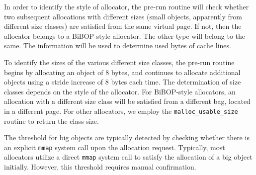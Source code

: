 In order to identify the style of allocator, the pre-run routine will check whether two subsequent allocations with different sizes (small objects, apparently from different size classes) are satisfied from the same virtual page. If not, then the allocator belongs to a BiBOP-style allocator. The other type will belong to the same. The information will be used to determine used bytes of cache lines. 

To identify the sizes of the various different size classes, the pre-run routine begins by allocating an object of 8 bytes, and continues to allocate additional objects using a stride increase of 8 bytes each time. The determination of size classes depends on the style of the allocator. For BiBOP-style allocators, an allocation with a different size class will be satisfied from a different bag, located in a different page. For other allocators, we employ the \texttt{malloc\_usable\_size} routine to return the class size. 

The threshold for big objects are typically detected by checking whether there is an explicit \texttt{mmap} system call upon the allocation request. Typically, most allocators utilize a direct \texttt{mmap} system call to satisfy the allocation of a big object initially. However, this threshold requires manual confirmation. 
